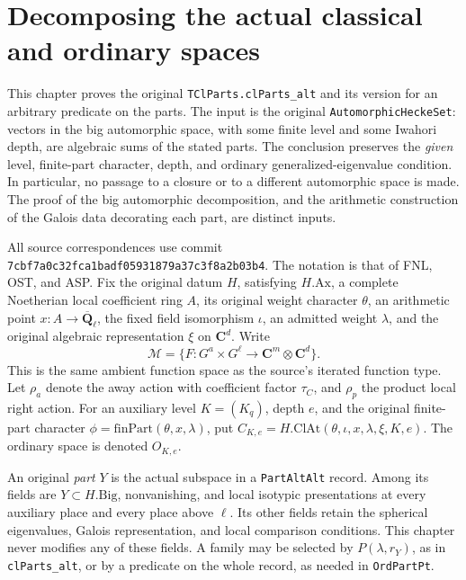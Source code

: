 \section{Decomposing the actual classical and ordinary spaces}
\label{sec:classical-parts-v43}

This chapter proves the original \texttt{TClParts.clParts\_alt} and its
version for an arbitrary predicate on the parts.  The input is the original
\texttt{AutomorphicHeckeSet}: vectors in the big automorphic space, with
some finite level and some Iwahori depth, are algebraic sums of the stated
parts.  The conclusion preserves the \emph{given} level, finite-part
character, depth, and ordinary generalized-eigenvalue condition.  In
particular, no passage to a closure or to a different automorphic space is
made.  The proof of the big automorphic decomposition, and the arithmetic
construction of the Galois data decorating each part, are distinct inputs.

All source correspondences use commit
\texttt{7cbf7a0c32fca1badf05931879a37c3f8a2b03b4}.
The notation is that of FNL, OST, and ASP.  Fix the original datum
\(H\), satisfying \(H.\mathrm{Ax}\), a complete Noetherian local
coefficient ring \(A\), its original weight character \(\theta\),
an arithmetic point \(x:A\to\overline{\mathbf Q}_\ell\),
the fixed field isomorphism \(\iota\), an admitted weight \(\lambda\),
and the original algebraic representation \(\xi\) on \(\mathbf C^d\).
Write
\[
 \mathcal M=\{F:G^a\times G^\ell\longrightarrow
                  \mathbf C^{m}\otimes\mathbf C^d\}.
\]
This is the same ambient function space as the source's iterated function
type.  Let \(\rho_a\) denote the away action with coefficient factor
\(\tau_C\), and \(\rho_p\) the product local right action.  For an
auxiliary level \(K=(K_q)\), depth \(e\), and the original finite-part
character \(\phi=\mathrm{finPart}(\theta,x,\lambda)\), put
\(C_{K,e}=H.\mathrm{ClAt}(\theta,\iota,x,\lambda,\xi,K,e)\).
The ordinary space is denoted \(O_{K,e}\).

An original \emph{part} \(Y\) is the actual subspace in a
\texttt{PartAltAlt} record.  Among its fields are \(Y\subset H.\mathrm{Big}\),
nonvanishing, and local isotypic presentations at every auxiliary place
and every place above \(\ell\).  Its other fields retain the spherical
eigenvalues, Galois representation, and local comparison conditions.  This
chapter never modifies any of these fields.  A family may be selected by
\(P(\lambda,r_Y)\), as in \texttt{clParts\_alt}, or by a predicate on the
whole record, as needed in \texttt{OrdPartPt}.

